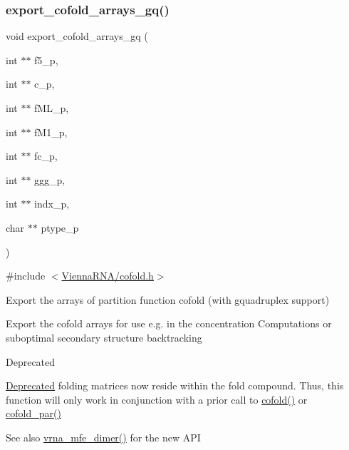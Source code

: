 \subsubsection{\texorpdfstring{export\+\_\+cofold\+\_\+arrays\+\_\+gq()}{export\_cofold\_arrays\_gq()}}
{\footnotesize\ttfamily void export\+\_\+cofold\+\_\+arrays\+\_\+gq (\begin{DoxyParamCaption}\item[{int $\ast$$\ast$}]{f5\+\_\+p,  }\item[{int $\ast$$\ast$}]{c\+\_\+p,  }\item[{int $\ast$$\ast$}]{f\+M\+L\+\_\+p,  }\item[{int $\ast$$\ast$}]{f\+M1\+\_\+p,  }\item[{int $\ast$$\ast$}]{fc\+\_\+p,  }\item[{int $\ast$$\ast$}]{ggg\+\_\+p,  }\item[{int $\ast$$\ast$}]{indx\+\_\+p,  }\item[{char $\ast$$\ast$}]{ptype\+\_\+p }\end{DoxyParamCaption})}



{\ttfamily \#include $<$\hyperlink{cofold_8h}{Vienna\+R\+N\+A/cofold.\+h}$>$}



Export the arrays of partition function cofold (with gquadruplex support) 

Export the cofold arrays for use e.\+g. in the concentration Computations or suboptimal secondary structure backtracking

\begin{DoxyRefDesc}{Deprecated}
\item[\hyperlink{deprecated__deprecated000035}{Deprecated}]folding matrices now reside within the fold compound. Thus, this function will only work in conjunction with a prior call to \hyperlink{group__mfe__global__deprecated_gabc8517f22cfe70595ee81fc837910d52}{cofold()} or \hyperlink{group__mfe__global__deprecated_ga7612cfeeb1b793f1e4179b1eb53df1f3}{cofold\+\_\+par()}\end{DoxyRefDesc}


\begin{DoxySeeAlso}{See also}
\hyperlink{group__mfe__global_gaab22d10c1190f205f16a77cab9d5d3ee}{vrna\+\_\+mfe\+\_\+dimer()} for the new A\+PI
\end{DoxySeeAlso}


